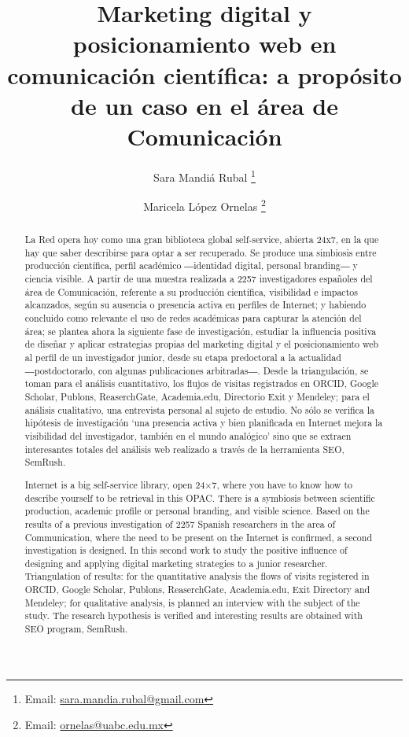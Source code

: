 \documentclass{textolivre}
\title{Marketing digital y posicionamiento web en comunicación científica: a propósito de un caso en el área de Comunicación}
\author[1]{Sara Mandiá Rubal \orcid{0000-0003-4452-2751} \thanks{Email: \url{sara.mandia.rubal@gmail.com}}}
\author[2]{Maricela López Ornelas \orcid{0000-0002-4215-5591} \thanks{Email: \url{ornelas@uabc.edu.mx}}}
\affil[1]{Universidade da Coruña, Coruña, España.}
\affil[2]{Universidad Autónoma de Baja California, Baja California, México.}
\begin{document}
\maketitle

\begin{polyabstract}
\begin{abstract}
La Red opera hoy como una gran biblioteca global self-service, abierta 24x7, en la que hay que saber describirse para optar a ser recuperado. Se produce una simbiosis entre producción científica, perfil académico ―identidad digital, personal branding― y ciencia visible. A partir de una muestra realizada a 2257 investigadores españoles del área de Comunicación, referente a su producción científica, visibilidad e impactos alcanzados, según su ausencia o presencia activa en perfiles de Internet; y habiendo concluido como relevante el uso de redes académicas para capturar la atención del área; se plantea ahora la siguiente fase de investigación, estudiar la influencia positiva de diseñar y aplicar estrategias propias del marketing digital y el posicionamiento web al perfil de un investigador junior, desde su etapa predoctoral a la actualidad ―postdoctorado, con algunas publicaciones arbitradas―. Desde la triangulación, se toman para el análisis cuantitativo, los flujos de visitas registrados en ORCID, Google Scholar, Publons, ReaserchGate, Academia.edu, Directorio Exit y Mendeley; para el análisis cualitativo, una entrevista personal al sujeto de estudio. No sólo se verifica la hipótesis de investigación ‘una presencia activa y bien planificada en Internet mejora la visibilidad del investigador, también en el mundo analógico’ sino que se extraen interesantes totales del análisis web realizado a través de la herramienta SEO, SemRush.

\end{abstract}

\begin{english}
\begin{abstract}
Internet is a big self-service library, open 24×7, where you have to know how to describe yourself to be retrieval in this OPAC. There is a symbiosis between scientific production, academic profile or personal branding, and visible science. Based on the results of a previous investigation of 2257 Spanish researchers in the area of Communication, where the need to be present on the Internet is confirmed, a second investigation is designed. In this second work to study the positive influence of designing and applying digital marketing strategies to a junior researcher. Triangulation of results: for the quantitative analysis the flows of visits registered in ORCID, Google Scholar, Publons, ReaserchGate, Academia.edu, Exit Directory and Mendeley; for qualitative analysis, is planned an interview with the subject of the study. The research hypothesis is verified and interesting results are obtained with SEO program, SemRush.


\end{abstract}
\end{english}
\end{polyabstract}
\end{document}

